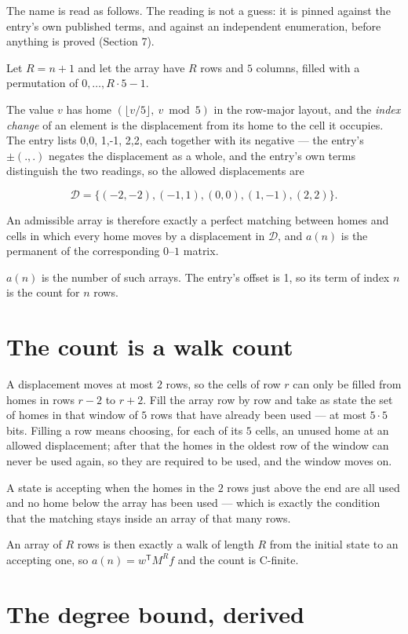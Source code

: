 \documentclass[11pt]{article}
\theoremstyle{definition}
\begin{document}
The name is read as follows. The reading is not a guess: it is pinned against the entry's own published terms, and against an independent enumeration, before anything is proved (Section 7).

Let $R = n + 1$ and let the array have $R$ rows and $5$ columns, filled with a permutation of $0,\dots,R\cdot5-1$.

The value $v$ has home $(\lfloor v/5\rfloor,\ v \bmod 5)$ in the row-major layout, and the {\itshape index change} of an element is the displacement from its home to the cell it occupies. The entry lists 0,0, 1,-1, 2,2, each together with its negative --- the entry's $\pm(.,.)$ negates the displacement as a whole, and the entry's own terms distinguish the two readings, so the allowed displacements are

\[\mathcal{D} = \{(-2,-2), (-1,1), (0,0), (1,-1), (2,2)\}.\]

An admissible array is therefore exactly a perfect matching between homes and cells in which every home moves by a displacement in $\mathcal{D}$, and $a(n)$ is the permanent of the corresponding $0$--$1$ matrix.

$a(n)$ is the number of such arrays. The entry's offset is 1, so its term of index $n$ is the count for $n$ rows.

\section{The count is a walk count}

A displacement moves at most $2$ rows, so the cells of row $r$ can only be filled from homes in rows $r-2$ to $r+2$. Fill the array row by row and take as state the set of homes in that window of $5$ rows that have already been used --- at most $5\cdot5$ bits. Filling a row means choosing, for each of its $5$ cells, an unused home at an allowed displacement; after that the homes in the oldest row of the window can never be used again, so they are required to be used, and the window moves on.

A state is accepting when the homes in the $2$ rows just above the end are all used and no home below the array has been used --- which is exactly the condition that the matching stays inside an array of that many rows.

An array of $R$ rows is then exactly a walk of length $R$ from the initial state to an accepting one, so $a(n) = w^{\mathsf T}M^{R}f$ and the count is C-finite.

\section{The degree bound, derived}
\end{document}
